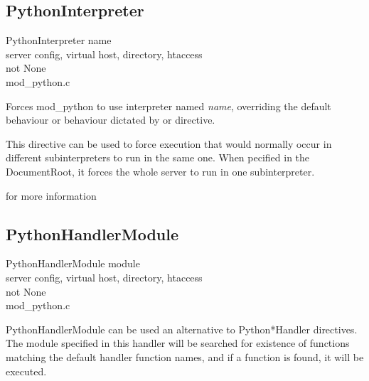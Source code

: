 \subsection{PythonInterpreter\label{dir-other-pi}}

PythonInterpreter name \\
server config, virtual host, directory, htaccess\\
not None\\
mod_python.c

Forces mod_python to use interpreter named \emph{name}, overriding the
default behaviour or behaviour dictated by
 or
 directive.

This directive can be used to force execution that would normally
occur in different subinterpreters to run in the same one. When
pecified in the DocumentRoot, it forces the whole server to run in one
subinterpreter.

\begin{seealso}
	{for more information}
\end{seealso}

\subsection{PythonHandlerModule\label{dir-other-phm}}

PythonHandlerModule module \\
server config, virtual host, directory, htaccess\\
not None\\
mod_python.c

PythonHandlerModule can be used an alternative to Python*Handler
directives. The module specified in this handler will be searched for
existence of functions matching the default handler function names,
and if a function is found, it will be executed.

